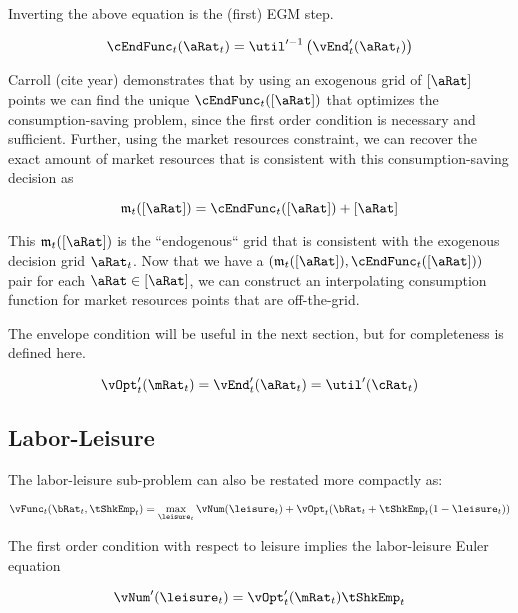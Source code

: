 \documentclass[\econtexRoot/EGMN]{subfiles}
\begin{document}
Inverting the above equation is the (first) EGM step.

\begin{equation}
  \cEndFunc_{t}(\aRat_{t}) = \util'^{-1}\left( \vEnd_{t}'(\aRat_{t})
  \right)
\end{equation}

Carroll (cite year) demonstrates that by using an exogenous grid of $[\aRat]$ points we can find the unique
$\cEndFunc_{t}([\aRat])$ that optimizes the consumption-saving problem, since the first order condition is necessary and sufficient.
Further, using the market resources constraint, we can recover the exact amount
of market resources that is consistent with this consumption-saving decision as

\providecommand{\mEndFunc}{\ensuremath{\mathfrak{m}}}

\begin{equation}
  \mEndFunc_{t}([\aRat]) = \cEndFunc_{t}([\aRat]) + [\aRat]
\end{equation}

This $\mEndFunc_{t}([\aRat])$ is the ``endogenous`` grid that is consistent
with the exogenous decision grid $\aRat_{t}$. Now that we have a
$(\mEndFunc_{t}([\aRat]), \cEndFunc_{t}([\aRat]))$ pair for each
$\aRat \in [\aRat]$, we can construct an interpolating consumption function for
market resources points that are off-the-grid.

The envelope condition will be useful in the next section, but for completeness
is defined here.

\begin{equation}
  \vOpt_{t}'(\mRat_{t}) = \vEnd_{t}'(\aRat_{t}) = \util'(\cRat_{t})
\end{equation}

\subsection{Labor-Leisure}

The labor-leisure sub-problem can also be restated more compactly as:

\begin{equation}
  \vFunc_{t}(\bRat_{t}, \tShkEmp_{t}) = \max_{ \leisure_{t}}
  \vNum(\leisure_{t}) + \vOpt_{t}(\bRat_{t} +
  \tShkEmp_{t}(1-\leisure_{t}))
\end{equation}

The first order condition with respect to leisure implies the labor-leisure Euler equation

\begin{equation}
  \vNum'(\leisure_{t}) =	\vOpt_{t}'(\mRat_{t}) \tShkEmp_{t}
\end{equation}
\end{document}
